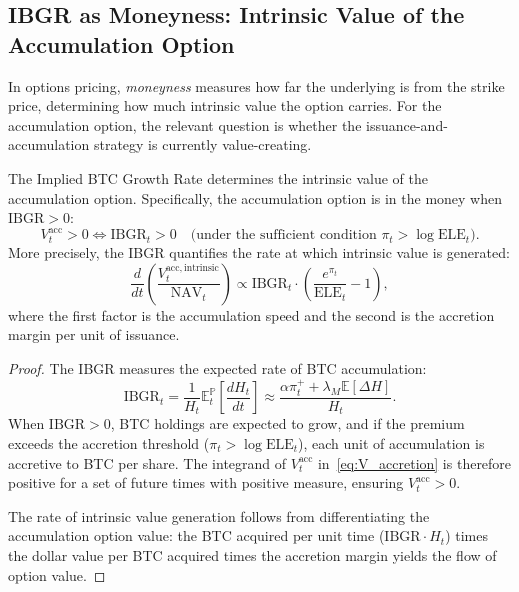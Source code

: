\subsection{IBGR as Moneyness: Intrinsic Value of the Accumulation Option}
\label{subsec:ibgr_moneyness}

In options pricing, \emph{moneyness} measures how far the underlying is from the strike price, determining how much intrinsic value the option carries. For the accumulation option, the relevant question is whether the issuance-and-accumulation strategy is currently value-creating.

\begin{proposition}
\label{prop:ibgr_moneyness}
The Implied BTC Growth Rate determines the intrinsic value of the accumulation option. Specifically, the accumulation option is in the money when $\mathrm{IBGR} > 0$:
\begin{equation}
\label{eq:ibgr_moneyness}
  V_t^{\mathrm{acc}} > 0 \iff \mathrm{IBGR}_t > 0 \quad \text{(under the sufficient condition } \pi_t > \log \mathrm{ELE}_t\text{)}.
\end{equation}
More precisely, the IBGR quantifies the rate at which intrinsic value is generated:
\begin{equation}
\label{eq:ibgr_intrinsic}
  \frac{d}{dt}\!\left(\frac{V_t^{\mathrm{acc,intrinsic}}}{\mathrm{NAV}_t}\right) \propto \mathrm{IBGR}_t \cdot \left(\frac{e^{\pi_t}}{\mathrm{ELE}_t} - 1\right),
\end{equation}
where the first factor is the accumulation speed and the second is the accretion margin per unit of issuance.
\end{proposition}

\begin{proof}
The IBGR measures the expected rate of BTC accumulation:
\[
  \mathrm{IBGR}_t = \frac{1}{H_t} \mathbb{E}_t^{\mathbb{P}}\!\left[\frac{dH_t}{dt}\right] \approx \frac{\alpha \pi_t^+ + \lambda_M \mathbb{E}[\Delta H]}{H_t}.
\]
When $\mathrm{IBGR} > 0$, BTC holdings are expected to grow, and if the premium exceeds the accretion threshold ($\pi_t > \log \mathrm{ELE}_t$), each unit of accumulation is accretive to BTC per share. The integrand of $V_t^{\mathrm{acc}}$ in~\eqref{eq:V_accretion} is therefore positive for a set of future times with positive measure, ensuring $V_t^{\mathrm{acc}} > 0$.

The rate of intrinsic value generation follows from differentiating the accumulation option value: the BTC acquired per unit time ($\mathrm{IBGR} \cdot H_t$) times the dollar value per BTC acquired times the accretion margin yields the flow of option value.
\end{proof}


